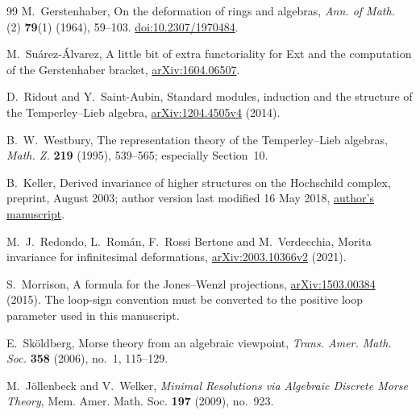 \documentclass[a4paper,11pt,oneside,reqno]{amsart}
\theoremstyle{definition}
\numberwithin{equation}{section}
\begin{document}
\begin{thebibliography}{99}
		M.~Gerstenhaber,
		On the deformation of rings and algebras,
		\emph{Ann. of Math.} (2) \textbf{79}(1) (1964), 59--103.
		\href{https://doi.org/10.2307/1970484}{doi:10.2307/1970484}.
		
		M.~Su\'{a}rez-\'{A}lvarez,
		A little bit of extra functoriality for Ext and the computation
		of the Gerstenhaber bracket,
		\href{https://arxiv.org/abs/1604.06507}{arXiv:1604.06507}.
		
		
		D.~Ridout and Y.~Saint-Aubin,
		Standard modules, induction and the structure of the Temperley--Lieb algebra,
		\href{https://arxiv.org/abs/1204.4505v4}{arXiv:1204.4505v4} (2014).
		
		
		B.~W.~Westbury,
		The representation theory of the Temperley--Lieb algebras,
		\emph{Math. Z.} \textbf{219} (1995), 539--565; especially Section~10.
		
		B.~Keller,
		Derived invariance of higher structures on the Hochschild complex,
		preprint, August 2003; author version last modified 16 May 2018,
		\href{https://webusers.imj-prg.fr/~bernhard.keller/publ/dih.pdf}{author's manuscript}.
		
		M.~J.~Redondo, L.~Rom\'an, F.~Rossi Bertone and M.~Verdecchia,
		Morita invariance for infinitesimal deformations,
		\href{https://arxiv.org/abs/2003.10366v2}{arXiv:2003.10366v2} (2021).
		
		S.~Morrison,
		A formula for the Jones--Wenzl projections,
		\href{https://arxiv.org/abs/1503.00384}{arXiv:1503.00384} (2015).
		The loop-sign convention must be converted to the positive loop parameter
		used in this manuscript.
		
		
		E.~Sk\"oldberg,
		Morse theory from an algebraic viewpoint,
		\emph{Trans. Amer. Math. Soc.}
		\textbf{358} (2006), no.~1, 115--129.
		
		M.~J\"ollenbeck and V.~Welker,
		\emph{Minimal Resolutions via Algebraic Discrete Morse Theory},
		Mem. Amer. Math. Soc. \textbf{197} (2009), no.~923.
	

\end{thebibliography}
\end{document}
